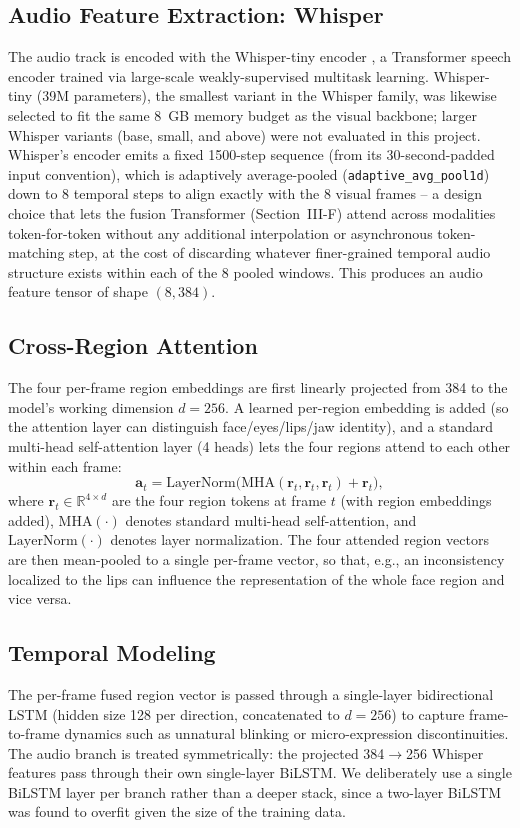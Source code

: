 \documentclass[conference]{IEEEtran}
\begin{document}
\subsection{Audio Feature Extraction: Whisper}
The audio track is encoded with the Whisper-tiny encoder
\cite{radford2023whisper}, a Transformer speech encoder trained via
large-scale weakly-supervised multitask learning. Whisper-tiny (39M
parameters), the smallest variant in the Whisper family, was likewise
selected to fit the same 8~GB memory budget as the visual backbone; larger
Whisper variants (base, small, and above) were not evaluated in this
project. Whisper's encoder emits a
fixed 1500-step sequence (from its 30-second-padded input convention),
which is adaptively average-pooled (\texttt{adaptive\_avg\_pool1d}) down to
8 temporal steps to align exactly with the 8 visual frames -- a design
choice that lets the fusion Transformer (Section~III-F) attend across
modalities token-for-token without any additional interpolation or
asynchronous token-matching step, at the cost of discarding whatever
finer-grained temporal audio structure exists within each of the 8
pooled windows. This produces an audio feature tensor of shape $(8, 384)$.

\subsection{Cross-Region Attention}
The four per-frame region embeddings are first linearly projected from 384
to the model's working dimension $d=256$. A learned per-region embedding is
added (so the attention layer can distinguish face/eyes/lips/jaw
identity), and a standard multi-head self-attention layer (4 heads) lets
the four regions attend to each other within each frame:
\begin{equation}
\mathbf{a}_t = \mathrm{LayerNorm}\big(\mathrm{MHA}(\mathbf{r}_t,\mathbf{r}_t,\mathbf{r}_t) + \mathbf{r}_t\big),
\end{equation}
where $\mathbf{r}_t \in \mathbb{R}^{4\times d}$ are the four region tokens
at frame $t$ (with region embeddings added), $\mathrm{MHA}(\cdot)$ denotes
standard multi-head self-attention, and $\mathrm{LayerNorm}(\cdot)$ denotes
layer normalization. The four attended region
vectors are then mean-pooled to a single per-frame vector, so that, e.g., an
inconsistency localized to the lips can influence the representation of the
whole face region and vice versa.

\subsection{Temporal Modeling}
The per-frame fused region vector is passed through a single-layer
bidirectional LSTM \cite{hochreiter1997lstm,schuster1997bidirectional}
(hidden size 128 per direction, concatenated to $d=256$) to capture
frame-to-frame dynamics such as unnatural blinking or micro-expression
discontinuities. The audio branch is treated symmetrically: the projected
384$\to$256 Whisper features pass through their own single-layer BiLSTM. We
deliberately use a single BiLSTM layer per branch rather than a deeper
stack, since a two-layer BiLSTM was found to overfit given the size of the
training data.
\end{document}
